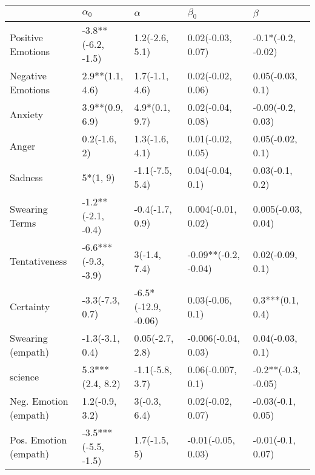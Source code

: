 \begin{tabular}{lllll}
\toprule
{} &           $\alpha_0$ &             $\alpha$ &             $\beta_0$ &              $\beta$ \\
\midrule
Positive Emotions     &   -3.8**(-6.2, -1.5) &       1.2(-2.6, 5.1) &     0.02(-0.03, 0.07) &   -0.1*(-0.2, -0.02) \\
Negative Emotions     &      2.9**(1.1, 4.6) &       1.7(-1.1, 4.6) &     0.02(-0.02, 0.06) &     0.05(-0.03, 0.1) \\
Anxiety               &      3.9**(0.9, 6.9) &       4.9*(0.1, 9.7) &     0.02(-0.04, 0.08) &    -0.09(-0.2, 0.03) \\
Anger                 &         0.2(-1.6, 2) &       1.3(-1.6, 4.1) &     0.01(-0.02, 0.05) &     0.05(-0.02, 0.1) \\
Sadness               &             5*(1, 9) &      -1.1(-7.5, 5.4) &      0.04(-0.04, 0.1) &      0.03(-0.1, 0.2) \\
Swearing Terms        &   -1.2**(-2.1, -0.4) &      -0.4(-1.7, 0.9) &    0.004(-0.01, 0.02) &   0.005(-0.03, 0.04) \\
Tentativeness         &  -6.6***(-9.3, -3.9) &         3(-1.4, 7.4) &  -0.09**(-0.2, -0.04) &     0.02(-0.09, 0.1) \\
Certainty             &      -3.3(-7.3, 0.7) &  -6.5*(-12.9, -0.06) &      0.03(-0.06, 0.1) &     0.3***(0.1, 0.4) \\
Swearing (empath)     &      -1.3(-3.1, 0.4) &      0.05(-2.7, 2.8) &   -0.006(-0.04, 0.03) &     0.04(-0.03, 0.1) \\
science               &     5.3***(2.4, 8.2) &      -1.1(-5.8, 3.7) &     0.06(-0.007, 0.1) &  -0.2**(-0.3, -0.05) \\
Neg. Emotion (empath) &       1.2(-0.9, 3.2) &         3(-0.3, 6.4) &     0.02(-0.02, 0.07) &    -0.03(-0.1, 0.05) \\
Pos. Emotion (empath) &  -3.5***(-5.5, -1.5) &         1.7(-1.5, 5) &    -0.01(-0.05, 0.03) &    -0.01(-0.1, 0.07) \\
\bottomrule
\end{tabular}
